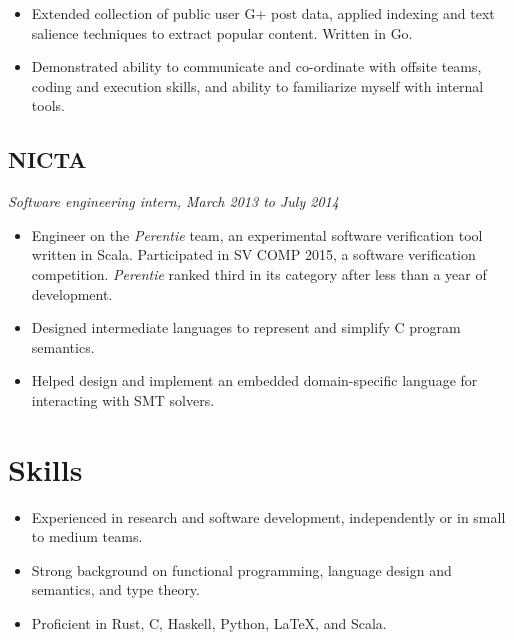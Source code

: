 \documentclass{article}
\begin{document}
\begin{multicols*}{2}
\begin{itemize}[leftmargin=12pt, itemsep=-2pt, topsep=-4pt]
 \item {
  Extended collection of public user G+ post data, applied indexing and text salience techniques to extract popular content. Written in Go.
 }
 \item {
  Demonstrated ability to communicate and co-ordinate with offsite teams, coding and execution skills, and ability to familiarize myself with internal tools.
 }
\end{itemize}

\subsection*{NICTA}
\textit{Software engineering intern, March 2013 to July 2014}

\begin{itemize}[leftmargin=12pt, itemsep=-2pt, topsep=-4pt]
 \item {
  Engineer on the \textit{Perentie} team, an experimental software verification tool written in Scala. Participated in SV COMP 2015, a software verification competition. \textit{Perentie} ranked third in its category after less than a year of development.
 }
 \item {
  Designed intermediate languages to represent and simplify C program semantics.
 }
 \item {
  Helped design and implement an embedded domain-specific language for interacting with SMT solvers.
 }
\end{itemize}

\section*{Skills}

\begin{itemize}[leftmargin=12pt, itemsep=-2pt, topsep=-4pt]
 \item {
  Experienced in research and software development, independently or in small to medium teams.
 }
 \item {
  Strong background on functional programming, language design and semantics, and type theory.
 }
 \item {
  Proficient in Rust, C, Haskell, Python, \LaTeX, and Scala.
 }
\end{itemize}

\end{multicols*}
 
\end{document}
